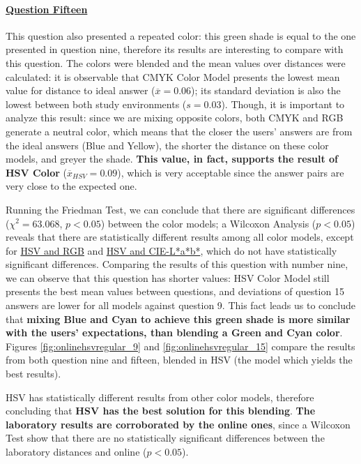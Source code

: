 \paragraph{\ul{Question Fifteen}}
%
This question also presented a repeated color: this green shade is equal to the one presented in question nine, therefore its results are interesting to compare with this question.
The colors were blended and the mean values over distances were calculated: it is observable that CMYK Color Model presents the lowest mean value
for distance to ideal answer ($\overline{x} = 0.06$); its standard deviation is also the lowest between both study environments ($s = 0.03$). Though, it is important to analyze this result: since we
are mixing opposite colors, both CMYK and RGB generate a neutral color, which means that the closer the users' answers are from the ideal answers (Blue and Yellow), the shorter the distance on these color
models, and greyer the shade. \textbf{This value, in fact, supports the result of HSV Color} ($\overline{x}_{HSV} = 0.09$), which is very acceptable since the answer pairs are very close to the expected one. \par
%
Running the Friedman Test, we can conclude that there are significant differences ($\chi^2 = 63.068$, $p < 0.05$) between the color models; a Wilcoxon Analysis ($p < 0.05$) reveals that
there are statistically different results among all color models, except for \ul{HSV and RGB} and \ul{HSV and CIE-L*a*b*}, which do not have statistically significant differences.
Comparing the results of this question with number nine, we can observe that this question has shorter values: HSV Color Model still presents the best mean values between questions, and deviations of question 15
answers are lower for all models against question 9. This fact leads us to conclude that \textbf{mixing Blue and Cyan to achieve this green shade is more similar with the users' expectations, than blending a Green and
Cyan color}. Figures \ref{fig:onlinehsvregular_9} and \ref{fig:onlinehsvregular_15} compare the results from both question nine and fifteen, blended in HSV (the model which yields the best results). \par
%
HSV has statistically different results from other color models, therefore concluding that \textbf{HSV has the best solution for this blending}. \textbf{The laboratory results are corroborated by the online ones}, since a Wilcoxon Test show that there
are no statistically significant differences between the laboratory distances and online ($p < 0.05$).\par
